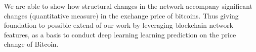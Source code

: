 \documentclass[12pt,a4paper]{article}
\numberwithin{equation}{section}
\numberwithin{figure}{section}
\numberwithin{table}{section}
\begin{document}
We are able to show how structural changes in the network accompany significant changes (quantitative measure) in the exchange price of bitcoins. Thus giving foundation to possible extend of our work by  leveraging blockchain network features, as a basis to conduct deep learning learning prediction on the price change of Bitcoin.





 

\end{document}
